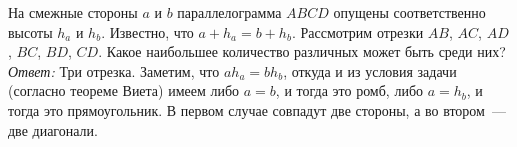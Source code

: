 \problem
На смежные стороны $a$ и $b$ параллелограмма $ABCD$ опущены соответственно
высоты $h_a$ и $h_b$.
Известно, что $a + h_a = b + h_b$.
Рассмотрим отрезки $AB$, $AC$, $AD$, $BC$, $BD$, $CD$.
Какое наибольшее количество различных может быть среди них?
\solution
\label{solution:2011/ru/regatta/junior/geomt/4}%
\emph{Ответ:} Три отрезка.
Заметим, что $a h_a = b h_b$, откуда и из условия задачи
(согласно теореме Виета) имеем либо $a = b$, и тогда это ромб, либо $a = h_b$,
и тогда это прямоугольник.
В первом случае совпадут две стороны, а во втором~--- две диагонали.
\endproblem
